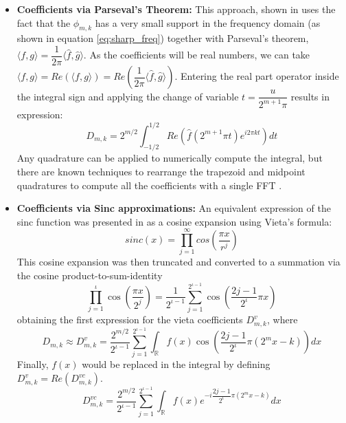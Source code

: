 \documentclass[12,twoside]{mammeTFM}
\theoremstyle{definition}
\theoremstyle{remark}
\begin{document}
\begin{itemize}
\item{ \textbf{Coefficients via Parseval's Theorem: } This approach, shown in \cite{ort16} uses the fact that the $\phi_{m,k}$ has a very small support in the frequency domain (as shown in equation \ref{eq:sharp_freq}) together with Parseval's theorem, 
$\langle f, g \rangle = \dfrac{1}{2 \pi}\langle \hat{f}, \hat{g} \rangle$. As the coefficients will be real numbers, we can take $\langle f, g \rangle = Re \left( \langle f, g \rangle \right) = Re \left( \dfrac{1}{2 \pi}\langle \hat{f}, \hat{g} \rangle \right)$. Entering the real part operator inside the integral sign and applying the change of variable $t = \dfrac{u}{2^{m+1} \pi}$ results in expression:
\begin{equation}
D_{m,k} = 2^{m/2} \int_{-1/2}^{1/2} Re \left(\hat{f}(2^{m+1} \pi t) e^{i2\pi k t} \right) dt
\end{equation} 
Any quadrature can be applied to numerically compute the integral, but there are known techniques to rearrange the trapezoid and midpoint quadratures to compute all the coefficients with a single FFT \cite{mar17, flo20}.
}
\item { \textbf{Coefficients via Sinc approximations: }
An equivalent expression of the sinc function was presented in \cite{ort16} as a cosine expansion using Vieta's formula: 
\begin{equation}
sinc(x) = \prod_{j = 1}^{\infty} cos \left( \dfrac{\pi x}{r^j} \right)
\end{equation}
This cosine expansion was then truncated and converted to a summation via the cosine product-to-sum-identity
\begin{equation} \label{eq:density_v}
\prod_{j=1}^{\iota} \cos \left(\frac{\pi x}{2^{j}}\right)=\frac{1}{2^{\iota-1}} \sum_{j=1}^{2^{\iota-1}} \cos \left(\frac{2 j-1}{2^{\iota}} \pi x\right)
\end{equation}
obtaining the first expression for the vieta coefficients $D_{m,k}^v$, where
\begin{equation}
D_{m,k} \approx D_{m,k}^{v}= \frac{2^{m / 2}}{2^{\iota-1}} \sum_{j=1}^{2^{\iota-1}} \int_{\mathbb{R}} f(x) \cos \left(\frac{2 j-1}{2^{\iota}} \pi\left(2^{m} x-k\right)\right) d x
\end{equation} \label{eq:density_vc}
Finally, $f(x)$ would be replaced in the integral by defining $D_{m,k}^{v} = Re \left( D_{m,k}^{vc} \right)$. 
\begin{equation}
D_{m,k}^{vc} =  \dfrac{2^{m / 2}}{2^{\iota-1}} \sum_{j=1}^{2^{\iota-1}} \int_{\mathbb{R}} f(x) e^{-i\dfrac{2 j-1}{2^{\iota}} \pi\left(2^{m} x-k\right) } d x

\end{equation}}
\end{itemize}
\end{document}
